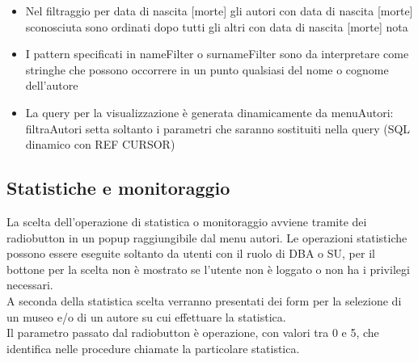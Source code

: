 \begin{itemize}
\begin{itemize}
		\item Nel filtraggio per data di nascita [morte] gli autori con data di nascita [morte] sconosciuta sono ordinati dopo tutti gli altri con data di nascita [morte] nota
		\item I pattern specificati in nameFilter o surnameFilter sono da interpretare come stringhe che possono occorrere in un punto qualsiasi del nome o cognome dell'autore
		\item La query per la visualizzazione è generata dinamicamente da menuAutori: filtraAutori setta soltanto i parametri che saranno sostituiti nella query (SQL dinamico con REF CURSOR)
	\end{itemize}
\end{itemize}

\subsection{Statistiche e monitoraggio}
La scelta dell'operazione di statistica o monitoraggio avviene tramite dei radiobutton in un popup raggiungibile dal menu autori.
Le operazioni statistiche possono essere eseguite soltanto da utenti con il ruolo di DBA o SU, per il bottone per la scelta non è mostrato
se l'utente non è loggato o non ha i privilegi necessari.\\
A seconda della statistica scelta verranno presentati dei form per la selezione di un museo e/o di un autore su cui effettuare la statistica.\\
Il parametro passato dal radiobutton è operazione, con valori tra 0 e 5, che identifica nelle procedure chiamate la particolare statistica.\\

